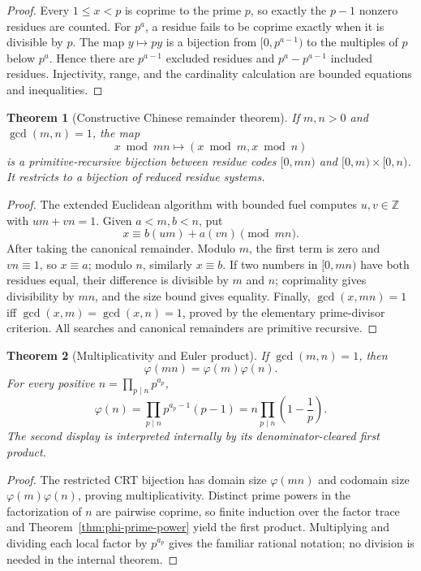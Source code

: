 \documentclass[11pt]{article}
\newtheorem{theorem}{Theorem}[section]
\theoremstyle{definition}
\newcommand{\Z}{\mathbb Z}
\begin{document}
\begin{proof}
Every \(1\le x<p\) is coprime to the prime \(p\), so exactly the \(p-1\)
nonzero residues are counted.  For \(p^a\), a residue fails to be coprime
exactly when it is divisible by \(p\).  The map
\(y\mapsto py\) is a bijection from \([0,p^{a-1})\) to the multiples of
\(p\) below \(p^a\).  Hence there are \(p^{a-1}\) excluded residues and
\(p^a-p^{a-1}\) included residues.  Injectivity, range, and the cardinality
calculation are bounded equations and inequalities.
\end{proof}

\begin{theorem}[Constructive Chinese remainder theorem]\label{thm:crt}
If \(m,n>0\) and \(\gcd(m,n)=1\), the map
\[
 x\bmod mn\longmapsto(x\bmod m,x\bmod n)
\]
is a primitive-recursive bijection between residue codes
\([0,mn)\) and \([0,m)\times[0,n)\).  It restricts to a bijection of reduced
residue systems.
\end{theorem}

\begin{proof}
The extended Euclidean algorithm with bounded fuel computes \(u,v\in\Z\)
with \(um+vn=1\).  Given \(a<m,b<n\), put
\[
 x\equiv b(um)+a(vn)\pmod{mn}.
\]
After taking the canonical remainder.  Modulo \(m\), the first term is zero
and \(vn\equiv1\), so \(x\equiv a\); modulo \(n\), similarly
\(x\equiv b\).  If two numbers in \([0,mn)\) have both residues equal, their
difference is divisible by \(m\) and \(n\); coprimality gives divisibility by
\(mn\), and the size bound gives equality.  Finally,
\(\gcd(x,mn)=1\) iff \(\gcd(x,m)=\gcd(x,n)=1\), proved by the elementary
prime-divisor criterion.  All searches and canonical remainders are primitive
recursive.
\end{proof}

\begin{theorem}[Multiplicativity and Euler product]\label{thm:phi-product}
If \(\gcd(m,n)=1\), then
\[
 \varphi(mn)=\varphi(m)\varphi(n).
\]
For every positive \(n=\prod_{p\mid n}p^{a_p}\),
\[
 \boxed{\displaystyle
 \varphi(n)=\prod_{p\mid n}p^{a_p-1}(p-1)
 =n\prod_{p\mid n}\left(1-\frac1p\right).}
\]
The second display is interpreted internally by its denominator-cleared first
product.
\end{theorem}

\begin{proof}
The restricted CRT bijection has domain size \(\varphi(mn)\) and codomain size
\(\varphi(m)\varphi(n)\), proving multiplicativity.  Distinct prime powers in
the factorization of \(n\) are pairwise coprime, so finite induction over the
factor trace and Theorem~\ref{thm:phi-prime-power} yield the first product.
Multiplying and dividing each local factor by \(p^{a_p}\) gives the familiar
rational notation; no division is needed in the internal theorem.
\end{proof}
\end{document}
